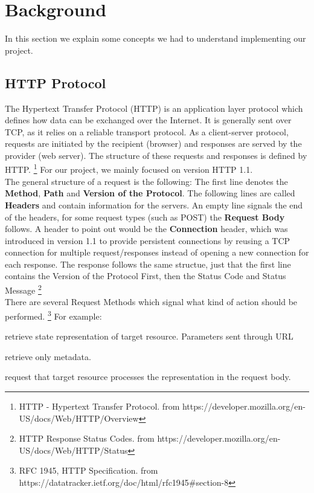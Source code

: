 \section*{Background}
In this section we explain some concepts we had to understand implementing our project. 

\subsection*{HTTP Protocol}
The Hypertext Transfer Protocol (HTTP) is an application layer protocol which defines how data can be exchanged over the Internet. It is generally sent over TCP, as it relies on a reliable transport protocol. 
As a client-server protocol, requests are initiated by the recipient (browser) and responses are served by the provider (web server). The structure of these requests and responses is defined by HTTP. \footnote{HTTP - Hypertext Transfer Protocol. from https://developer.mozilla.org/en-US/docs/Web/HTTP/Overview} For our project, we mainly focused on version HTTP 1.1. \\

The general structure of a request is the following: The first line denotes the \textbf{Method}, \textbf{Path} and \textbf{Version of the Protocol}. The following lines are called \textbf{Headers} and contain information for the servers. An empty line signals the end of the headers, for some request types (such as POST) the \textbf{Request Body} follows. A header to point out would be the \textbf{Connection} header, which was introduced in version 1.1 to provide persistent connections by reusing a TCP connection for multiple request/responses instead of opening a new connection for each response. The response follows the same structue, just that the first line contains the Version of the Protocol First, then the Status Code and Status Message \footnote{HTTP Response Status Codes. from https://developer.mozilla.org/en-US/docs/Web/HTTP/Status} \\

There are several Request Methods which signal what kind of action should be performed. \footnote{RFC 1945, HTTP Specification. from https://datatracker.ietf.org/doc/html/rfc1945\#section-8} For example: 
\begin{description}[noitemsep, topsep=1pt,leftmargin=*]
    \item[GET]retrieve state representation of target resource. Parameters sent through URL 
    \item[HEAD]retrieve only metadata. 
    \item[POST]request that target resource processes the representation in the request body. 
\end{description}

